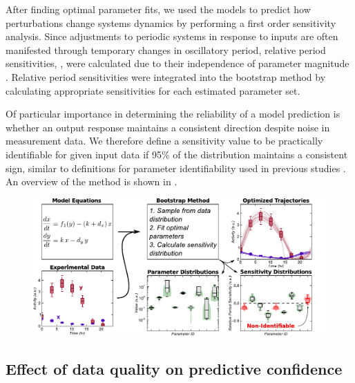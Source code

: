 {After finding optimal parameter fits, we used the models to predict how perturbations change systems dynamics by performing a first order sensitivity analysis. 
Since adjustments to periodic systems in response to inputs are often manifested through temporary changes in oscillatory period, relative period sensitivities, , were calculated due to their independence of parameter magnitude \cite{Bure1974, Kramer1984, Wilkins2009}. 
Relative period sensitivities were integrated into the bootstrap method by calculating appropriate sensitivities for each estimated parameter set.

Of particular importance in determining the reliability of a model prediction is whether an output response maintains a consistent direction despite noise in measurement data. 
We therefore define a sensitivity value to be practically identifiable for given input data if 95\% of the distribution maintains a consistent sign, similar to definitions for parameter identifiability used in previous studies \cite{Zak2003, Joshi2006}. 
An overview of the method is shown in .


\begin{figure}[h]
  \centering
  \includegraphics{chap3/figures/fig1.pdf}
  \label{fig:3_1}
\end{figure}

\subsection{Effect of data quality on predictive confidence}

}
